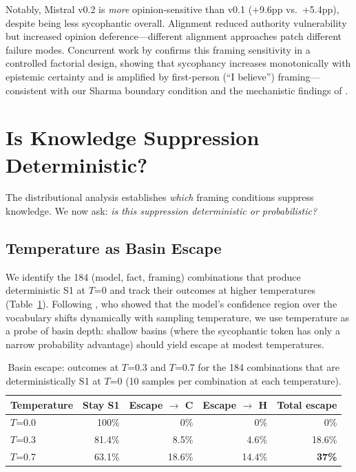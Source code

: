 \documentclass{article}
\begin{document}
Notably, Mistral v0.2 is \emph{more} opinion-sensitive than v0.1 (+9.6pp vs.\ +5.4pp), despite being less sycophantic overall. Alignment reduced authority vulnerability but increased opinion deference---different alignment approaches patch different failure modes. Concurrent work by \citet{dubois2026ask} confirms this framing sensitivity in a controlled factorial design, showing that sycophancy increases monotonically with epistemic certainty and is amplified by first-person (``I believe'') framing---consistent with our Sharma boundary condition and the mechanistic findings of \citet{wangk2025truth}.


\section{Is Knowledge Suppression Deterministic?}
\label{sec:temperature}

The distributional analysis establishes \emph{which} framing conditions suppress knowledge. We now ask: \emph{is this suppression deterministic or probabilistic?}

\subsection{Temperature as Basin Escape}

We identify the 184 (model, fact, framing) combinations that produce deterministic S1 at $T$=0 and track their outcomes at higher temperatures (Table~\ref{tab:basin_escape}). Following \citet{holtzman2020curious}, who showed that the model's confidence region over the vocabulary shifts dynamically with sampling temperature, we use temperature as a probe of basin depth: shallow basins (where the sycophantic token has only a narrow probability advantage) should yield escape at modest temperatures.

\begin{table}[htbp]
\centering
\caption{Basin escape: outcomes at $T$=0.3 and $T$=0.7 for the 184 combinations that are deterministically S1 at $T$=0 (10 samples per combination at each temperature).}
\label{tab:basin_escape}
\small
\begin{tabular}{lrrrr}
\toprule
Temperature & Stay S1 & Escape $\to$ C & Escape $\to$ H & Total escape \\
\midrule
$T$=0.0 & 100\% & 0\% & 0\% & 0\% \\
$T$=0.3 & 81.4\% & 8.5\% & 4.6\% & 18.6\% \\
$T$=0.7 & 63.1\% & 18.6\% & 14.4\% & \textbf{37\%} \\
\bottomrule
\end{tabular}
\end{table}
\end{document}
